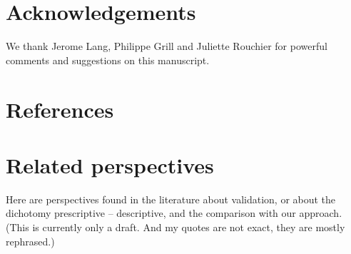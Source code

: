 \documentclass[preprint, french, english, 11pt, authoryear]{elsarticle}%
\newcommand{\commentOC}[1]{\textcolor{red}{OC: #1}}
\begin{document}



\section*{Acknowledgements}
We thank Jerome Lang, Philippe Grill and Juliette Rouchier for powerful comments and suggestions on this manuscript.

\section*{References}



\renewcommand*{\appendixname}{}
\appendix

\section{Related perspectives}
\label{sec-related}
Here are perspectives found in the literature about validation, or about the dichotomy prescriptive – descriptive, and the comparison with our approach. (This is currently only a draft. And my quotes are not exact, they are mostly rephrased.)
\end{document}
